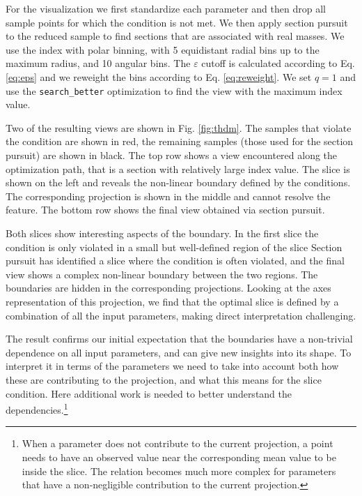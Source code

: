 \documentclass[]{interact}
\theoremstyle{plain}%
\theoremstyle{definition}
\theoremstyle{remark}
\begin{document}
For the visualization we first standardize each parameter and then drop
all sample points for which the condition is not met. We then apply
section pursuit to the reduced sample to find sections that are
associated with real masses. We use the index with polar binning, with 5
equidistant radial bins up to the maximum radius, and 10 angular bins.
The \(\varepsilon\) cutoff is calculated according to Eq. \ref{eq:eps}
and we reweight the bins according to Eq. \ref{eq:reweight}. We set
\(q=1\) and use the \texttt{search\_better} optimization to find the
view with the maximum index value.

Two of the resulting views are shown in Fig. \ref{fig:thdm}. The samples
that violate the condition are shown in red, the remaining samples
(those used for the section pursuit) are shown in black. The top row
shows a view encountered along the optimization path, that is a section
with relatively large index value. The slice is shown on the left and
reveals the non-linear boundary defined by the conditions. The
corresponding projection is shown in the middle and cannot resolve the
feature. The bottom row shows the final view obtained via section
pursuit.

Both slices show interesting aspects of the boundary. In the first slice
the condition is only violated in a small but well-defined region of the
slice Section pursuit has identified a slice where the condition is
often violated, and the final view shows a complex non-linear boundary
between the two regions. The boundaries are hidden in the corresponding
projections. Looking at the axes representation of this projection, we
find that the optimal slice is defined by a combination of all the input
parameters, making direct interpretation challenging.

The result confirms our initial expectation that the boundaries have a
non-trivial dependence on all input parameters, and can give new
insights into its shape. To interpret it in terms of the parameters we
need to take into account both how these are contributing to the
projection, and what this means for the slice condition. Here additional
work is needed to better understand the
dependencies.\footnote{When a parameter does not contribute to the current projection, a point needs to have an observed value near the corresponding mean value to be inside the slice. The relation becomes much more complex for parameters that have a non-negligible contribution to the current projection.}
\end{document}
